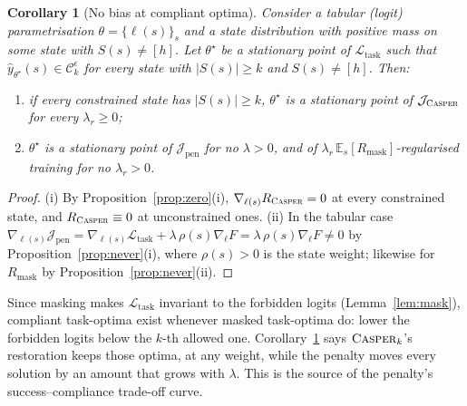 \documentclass[11pt]{article}
\providecommand{\casper}{\textnormal{\textsc{Casper}}}
\newcommand{\yh}{\hat y}
\newcommand{\1}{\mathbf 1}
\newcommand{\Ck}{\mathcal C_k^{\epsilon}}
\newcommand{\Rc}{R_{\casper}}
\newcommand{\Rm}{R_{\mathrm{mask}}}
\newtheorem{corollary}[proposition]{Corollary}
\theoremstyle{definition}
\theoremstyle{remark}
\begin{document}
\begin{corollary}[No bias at compliant optima]\label{cor:stationary}
Consider a tabular (logit) parametrisation $\theta=\{\ell(s)\}_s$ and a state distribution with
positive mass on some state with $S(s)\neq[h]$. Let $\theta^\star$ be a stationary point of
$\mathcal L_{\mathrm{task}}$ such that $\yh_{\theta^\star}(s)\in\Ck$ for every state with
$|S(s)|\ge k$ and $S(s)\neq[h]$. Then:
\begin{enumerate}
\item[(i)] if every constrained state has $|S(s)|\ge k$, $\theta^\star$ is a stationary point of
$\mathcal J_{\casper}$ for every $\lambda_r\ge0$;
\item[(ii)] $\theta^\star$ is a stationary point of $\mathcal J_{\mathrm{pen}}$ for no $\lambda>0$,
and of $\lambda_r\,\mathbb E_s[\Rm]$-regularised training for no $\lambda_r>0$.
\end{enumerate}
\end{corollary}
\begin{proof}
(i) By Proposition~\ref{prop:zero}(i), $\nabla_{\ell(s)}\Rc=0$ at every constrained state, and
$\Rc\equiv0$ at unconstrained ones. (ii) In the tabular case $\nabla_{\ell(s)}\mathcal J_{\mathrm{pen}}
=\nabla_{\ell(s)}\mathcal L_{\mathrm{task}}+\lambda\,\rho(s)\nabla_\ell F=\lambda\,\rho(s)\nabla_\ell F
\neq0$ by Proposition~\ref{prop:never}(i), where $\rho(s)>0$ is the state weight; likewise for $\Rm$
by Proposition~\ref{prop:never}(ii).
\end{proof}

Since masking makes $\mathcal L_{\mathrm{task}}$ invariant to the forbidden logits
(Lemma~\ref{lem:mask}), compliant task-optima exist whenever masked task-optima do: lower the
forbidden logits below the $k$-th allowed one. Corollary~\ref{cor:stationary} says $\casper_k$'s
restoration keeps those optima, at any weight, while the penalty moves every solution by an amount
that grows with $\lambda$. This is the source of the penalty's success--compliance trade-off curve.
\end{document}
